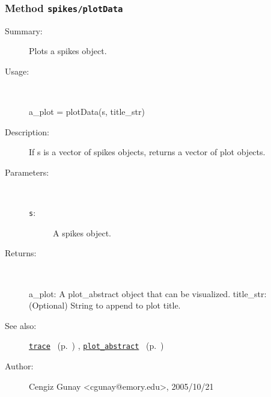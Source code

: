 \subsubsection[Method \texttt{plotData}]{Method \texttt{spikes/plotData}}%
%
\label{ref_spikes__plotData}%
\hypertarget{ref_spikes__plotData}{}%
\begin{description}
\item[Summary:]Plots a spikes object.
%
\item[Usage:]~%
\begin{lyxcode}%
a\_plot = plotData(s, title\_str)
%
\end{lyxcode}%
%
\item[Description:]%
If s is a vector of spikes objects, returns a vector of plot objects.
\item[Parameters:]~
\begin{description}%
\item[\texttt{s}:]
 A spikes object.
\end{description}%
%
\item[Returns:]~

	a\_plot: A plot\_abstract object that can be visualized.
	title\_str: (Optional) String to append to plot title.
%
%
\item[See also:]%
\hyperlink{ref_trace}{\texttt{trace}}%
\ (p.~\pageref{ref_trace})%
%
, \hyperlink{ref_plot_abstract}{\texttt{plot\_abstract}}%
\ (p.~\pageref{ref_plot_abstract})%
%
%
\item[Author:]%
Cengiz Gunay <cgunay@emory.edu>, 2005/10/21%
\end{description}
\methodline%
